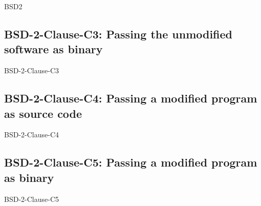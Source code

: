 \begin{license}{BSD2}
\subsection{BSD-2-Clause-C3: Passing the unmodified software as binary}
\begin{lsuc}{BSD-2-Clause-C3}

  \lsucmeans{\useCaseThree}
  \lsuccovers{\coversThree}

  \begin{lsucrequires}  
    \lsucmandatory{\insertLicenseIntoBinary}\passingFilesCorrectly
  \end{lsucrequires}

  \lsucprohibitsnothing
\end{lsuc}

\subsection{BSD-2-Clause-C4: Passing a modified program as source code}
\begin{lsuc}{BSD-2-Clause-C4}

  \lsucmeans{\useCaseFour}
  \lsuccovers{\coversFour}

  \begin{lsucrequires}
    \lsucmandatory{\keepLicenseElements}
    \lsucoptional{\addLicenseToCopyrightMessage}
  \end{lsucrequires}

  \lsucprohibitsnothing
\end{lsuc}

\subsection{BSD-2-Clause-C5: Passing a modified program as binary}
\begin{lsuc}{BSD-2-Clause-C5}

  \lsucmeans{\useCaseFive}
  \lsuccovers{\coversFive}

  \begin{lsucrequires}
    \lsucmandatory{\insertLicenseIntoBinary}\passingFilesCorrectly
    \lsucoptional{\addLicenseToCopyrightMessage}
  \end{lsucrequires}


\end{lsuc}
\end{license}
